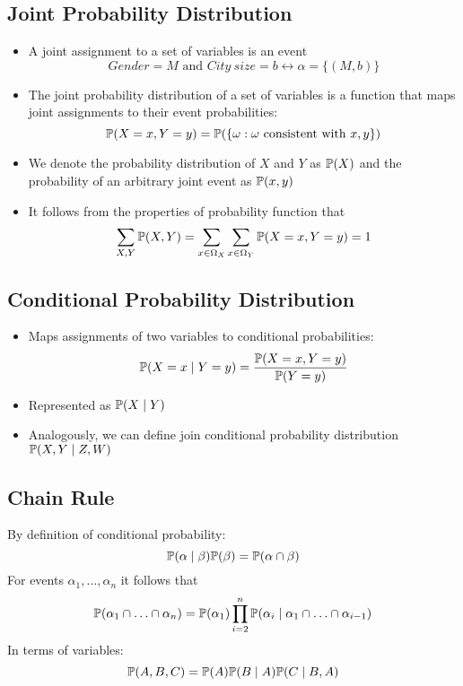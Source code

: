 \subsection{Joint Probability Distribution}
	\begin{frame}
		\begin{itemize}
			\item A joint assignment to a set of variables is an event
				\[ {Gender} = M \text{ and } {City\ size} = b \leftrightarrow \alpha = \{ ( M , b ) \} \]
			\item The joint probability distribution of a set of variables is a function that maps joint assignments to their event probabilities:
				\[ \P( X = x , Y = y ) = \P( \{ \omega : \omega \text{ consistent with } x, y  \} ) \]
			\item We denote the probability distribution of $X$ and $Y$ as $\P( X )$ and the probability of an arbitrary joint event as $\P( x , y )$
			\item It follows from the properties of probability function that
				\[ \sum_{X,Y} \P( X , Y ) = \sum_{x \in \Omega_X} \sum_{x \in \Omega_Y}\P( X = x , Y = y ) = 1 \]
		\end{itemize}
	\end{frame}

\subsection{Conditional Probability Distribution}
	\begin{frame}
		\begin{itemize}
			\item Maps assignments of two variables to conditional probabilities:
				\[ \P( X = x \mid Y = y ) = \frac{\P( X = x , Y = y )}{\P( Y = y )} \]
			\item Represented as $\P( X \mid Y )$
			\item Analogously, we can define join conditional probability distribution $\P( X , Y \mid Z , W )$
		\end{itemize}
	\end{frame}

\subsection{Chain Rule}
	\begin{frame}
		By definition of conditional probability:
			\[ \P( \alpha \mid \beta ) \P( \beta ) = \P( \alpha \cap \beta ) \]
		For events $\alpha_1 , \ldots , \alpha_n$ it follows that
			\[ \P( \alpha_1 \cap \ldots \cap \alpha_n ) = \P( \alpha_1 ) \prod_{i=2}^{n} \P( \alpha_i \mid \alpha_1 \cap \ldots \cap \alpha_{i-1} ) \]
		In terms of variables:
			\[ \P( A , B , C ) = \P( A ) \P( B \mid A ) \P( C \mid B , A ) \]
	\end{frame}

